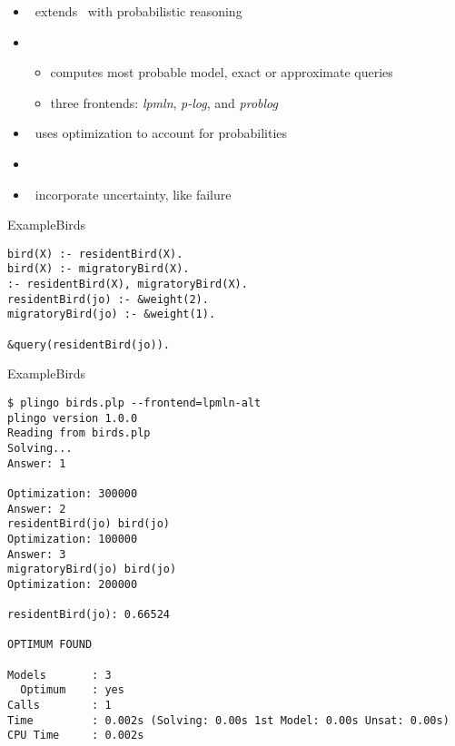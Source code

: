 \begin{frame}{\plingo}
  \begin{itemize}
  \item {} \ extends \clingo\ with probabilistic reasoning
  \item {}
  \begin{itemize}
  \item computes most probable model, exact or approximate queries
  \item three frontends: \textit{lpmln}, \textit{p-log}, and \textit{problog}
  \end{itemize}
  \item {}   \  uses optimization to account for probabilities
  \item {}   \ \cite{hajakarorusc22a}
  \item {} \ incorporate uncertainty, like failure
  \end{itemize}
\end{frame}
\begin{frame}[fragile]{Example}{Birds}
\begin{lstlisting}[escapeinside=||]
bird(X) :- residentBird(X).
bird(X) :- migratoryBird(X).
:- residentBird(X), migratoryBird(X).
residentBird(jo) :- &weight(2).
migratoryBird(jo) :- &weight(1).

&query(residentBird(jo)).
\end{lstlisting}
\end{frame}

\begin{frame}[fragile]{Example}{Birds}
\begin{lstlisting}[escapeinside=||]
$ plingo birds.plp --frontend=lpmln-alt
plingo version 1.0.0
Reading from birds.plp
Solving...
Answer: 1

Optimization: 300000
Answer: 2
residentBird(jo) bird(jo)
Optimization: 100000
Answer: 3
migratoryBird(jo) bird(jo)
Optimization: 200000    

residentBird(jo): 0.66524  

OPTIMUM FOUND

Models       : 3
  Optimum    : yes
Calls        : 1
Time         : 0.002s (Solving: 0.00s 1st Model: 0.00s Unsat: 0.00s)
CPU Time     : 0.002s
\end{lstlisting}
\end{frame}

  
%
